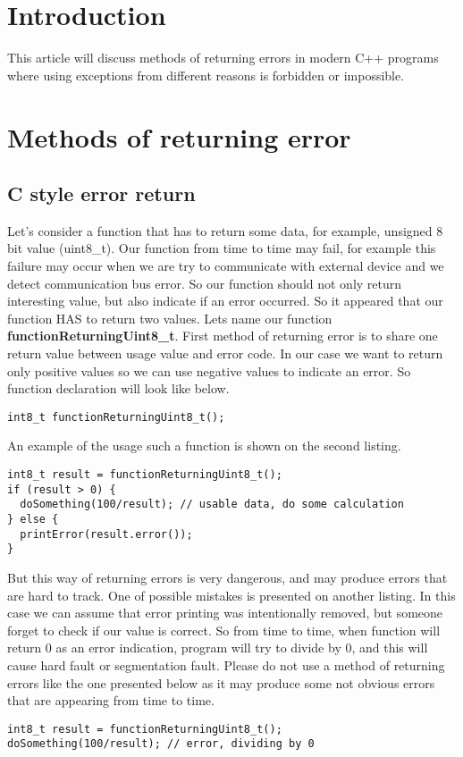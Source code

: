 \documentclass{article}
\let\Oldsection\section
\renewcommand{\section}{\FloatBarrier\Oldsection}
\let\Oldsubsection\subsection
\renewcommand{\subsection}{\FloatBarrier\Oldsubsection}
\begin{document}
\tableofcontents
\newpage
\section{Introduction}
This article will discuss methods of returning errors in modern C++ programs where using exceptions from different reasons is forbidden or impossible.
\section{Methods of returning error}
\subsection{C style error return}
Let's consider a function that has to return some data, for example, unsigned 8 bit value (uint8\_t). Our function from time to time may fail, for example this failure may occur when we are try to communicate with external device and we detect communication bus error. So our function should not only return interesting value, but also indicate if an error occurred. So it appeared that our function HAS to return two values.\newline 
Lets name our function \textbf{functionReturningUint8\_t}. First method of returning error is to share one return value between usage value and error code. In our case we want to return only positive values so we can use negative values to indicate an error. So function declaration will look like below.

\begin{lstlisting}
int8_t functionReturningUint8_t();
\end{lstlisting}

An example of the usage such a function is shown on the second listing.

\begin{lstlisting}
int8_t result = functionReturningUint8_t();
if (result > 0) {
  doSomething(100/result); // usable data, do some calculation    
} else {
  printError(result.error()); 
}
\end{lstlisting}

But this way of returning errors is very dangerous, and may produce errors that are hard to track. One of possible mistakes is presented on another listing. In this case we can assume that error printing was intentionally removed, but someone forget to check if our value is correct. So from time to time, when function will return 0 as an error indication, program will try to divide by 0, and this will cause hard fault or segmentation fault.\newline
Please do not use a method of returning errors like the one presented below as it may produce some not obvious errors that are appearing from time to time.
\begin{lstlisting}
int8_t result = functionReturningUint8_t();
doSomething(100/result); // error, dividing by 0   
\end{lstlisting}
\end{document}
